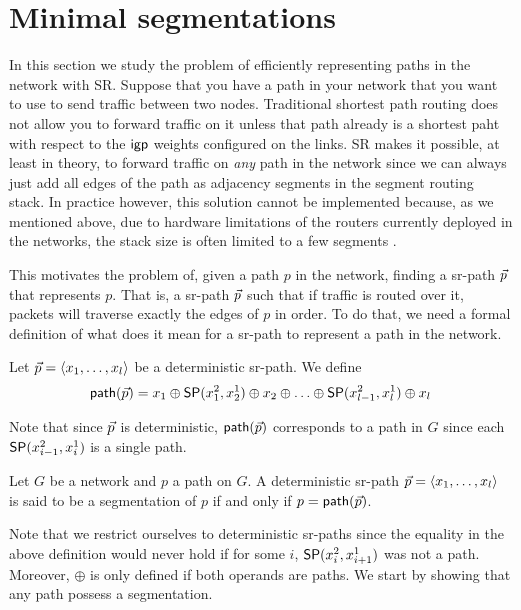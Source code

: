 \section{Minimal segmentations}

In this section we study the problem of efficiently representing paths in the network with SR.
Suppose that you have a path in your network that you want to use to send traffic between two nodes. Traditional
shortest path routing does not allow you to forward traffic on it unless that path already is a shortest paht with
respect to the $\igp$ weights configured on the links. SR makes it possible, at least in theory, to forward traffic
on \emph{any} path in the network since we can always just add all edges of the path as adjacency segments
in the segment routing stack. In practice however, this solution cannot be implemented because, as we mentioned above, 
due to hardware limitations of the routers currently deployed in the networks, 
the stack size is often limited to a few segments \cite{Tantsura_SID:2017}.

This motivates the problem of, given a path $p$ in the network, finding a sr-path $\sr{p}$ that represents $p$. That is, a sr-path $\sr{p}$
such that if traffic is routed over it, packets will traverse exactly the edges of $p$ in order. To do that, we need a formal definition of what 
does it mean for a sr-path to represent a path in the network.

\begin{definition}
Let $\sr{p} = \langle x_1, \ldots, x_l \rangle$ be a deterministic sr-path. We define
$$
\seq(\sr{p}) = x_1 \oplus \sp(x^2_1, x^1_2) \oplus x_2 \oplus \ldots \oplus \sp(x^2_{l - 1}, x^1_l) \oplus x_l
$$
\end{definition}

Note that since $\sr{p}$ is deterministic, $\seq(\sr{p})$ corresponds to a path in $G$ since each $\sp(x^2_{i - 1}, x^1_i)$
is a single path.

\begin{definition}
Let $G$ be a network and $p$ a path on $G$. A deterministic sr-path $\sr{p} = \langle x_1, \ldots, x_l \rangle$ is said to be a segmentation of $p$ if and only if
$p = \seq(\sr{p})$.
\end{definition}

Note that we restrict ourselves to deterministic sr-paths since the equality in the above definition would never hold if
for some $i$, $\sp(x^2_i, x^1_{i + 1})$ was not a path. Moreover, $\oplus$ is only defined if both operands are paths.
We start by showing that any path possess a segmentation.

